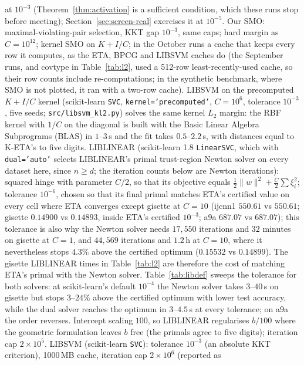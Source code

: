 \documentclass[pdflatex,sn-apa]{sn-jnl}%
\theoremstyle{thmstyleone}
\theoremstyle{thmstyletwo}
\newcommand{\norm}[1]{\lVert #1 \rVert}
\begin{document}
at $10^{-3}$ (Theorem~\ref{thm:activation} is a sufficient condition,
which these runs stop before meeting); Section~\ref{sec:screen-real}
exercises it at $10^{-5}$. Our SMO: maximal-violating-pair selection, KKT gap $10^{-3}$,
same caps; hard margin as $C=10^{12}$; kernel SMO on $K+I/C$; in the October runs a cache that keeps every
row it computes, as the ETA, BPCG and LIBSVM caches do (the September
runs, and covtype in Table~\ref{tab:l2}, used a 512-row
least-recently-used cache, so their row counts include re-computations;
in the synthetic benchmark, where SMO is not plotted, it ran with a
two-row cache). LIBSVM
on the precomputed $K+I/C$ kernel (scikit-learn \texttt{SVC},
\texttt{kernel='precomputed'}, $C{=}10^6$, tolerance $10^{-3}$, five
seeds; \texttt{src/libsvm\_kl2.py}) solves the same kernel $L_2$
margin: the RBF kernel with $1/C$ on the diagonal is built with the
Basic Linear Algebra Subprograms (BLAS) in
$1$--$3$\,s and the fit takes $0.5$--$2.2$\,s, with distances equal to
K-ETA's to five digits. LIBLINEAR
(scikit-learn 1.8 \texttt{LinearSVC}, which with \texttt{dual='auto'}
selects LIBLINEAR's primal trust-region Newton solver on every dataset
here, since $n\ge d$; the iteration counts below are Newton
iterations): squared hinge with parameter
$C/2$, so that its objective equals $\tfrac12\norm w^2+\tfrac C2\sum\xi_i^2$;
tolerance $10^{-6}$, chosen so that its final primal matches ETA's
certified value on every cell where ETA converges except gisette at
$C{=}10$ (ijcnn1 $550.61$ vs $550.61$; gisette $0.14900$ vs $0.14893$, inside
ETA's certified $10^{-3}$; a9a $687.07$ vs $687.07$); this
tolerance is also why the Newton solver needs $17{,}550$ iterations
and $32$ minutes on gisette at $C{=}1$, and $44{,}569$ iterations and
$1.2$\,h at $C{=}10$, where it nevertheless stops $4.3\%$ above the
certified optimum ($0.15532$ vs $0.14899$). The gisette LIBLINEAR times
in Table~\ref{tab:l2} are therefore the cost of matching ETA's primal
with the Newton solver. Table~\ref{tab:libdef} sweeps the tolerance for
both solvers: at scikit-learn's default $10^{-4}$ the Newton solver
takes $3$--$40$\,s on gisette but stops $3$--$24\%$ above the certified
optimum with lower test accuracy, while the dual solver reaches the
optimum in $3$--$4.5$\,s at every tolerance; on a9a the order reverses.
Intercept scaling $100$, so LIBLINEAR regularises $b/100$ where the
geometric formulation leaves $b$ free (the primals agree to five
digits); iteration cap
$2\times10^5$. LIBSVM
(scikit-learn \texttt{SVC}): tolerance $10^{-3}$ (an absolute KKT
criterion), 1000\,MB cache, iteration cap $2\times10^6$ (reported as
\end{document}
